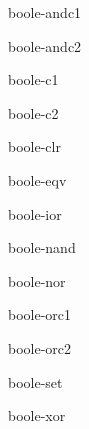 \begin{constant}{boole-andc1}{}{}
  
\end{constant}

\begin{constant}{boole-andc2}{}{}
  
\end{constant}

\begin{constant}{boole-c1}{}{}
  
\end{constant}

\begin{constant}{boole-c2}{}{}
  
\end{constant}

\begin{constant}{boole-clr}{}{}
  
\end{constant}

\begin{constant}{boole-eqv}{}{}
  
\end{constant}

\begin{constant}{boole-ior}{}{}
  
\end{constant}

\begin{constant}{boole-nand}{}{}
  
\end{constant}

\begin{constant}{boole-nor}{}{}
  
\end{constant}

\begin{constant}{boole-orc1}{}{}
  
\end{constant}

\begin{constant}{boole-orc2}{}{}
  
\end{constant}

\begin{constant}{boole-set}{}{}
  
\end{constant}

\begin{constant}{boole-xor}{}{}
  
\end{constant}

